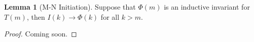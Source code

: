 \documentclass[12pt]{article}
\theoremstyle{definition}
\newtheorem{lemma}{Lemma}
\theoremstyle{remark}
\newcommand{\msp}{\text{ }}
\newcommand{\states}{\text{States}}
\newcommand{\perm}{\genfrac{}{}{0pt}{}}
\begin{document}
\begin{lemma}[M-N Initiation]
  Suppose that $\Phi(m)$ is an inductive invariant for $T(m)$, then $I(k) \rightarrow \Phi(k)$ for all $k>m$.
\end{lemma}
\begin{proof}
  Coming soon.


\end{proof}
\end{document}
